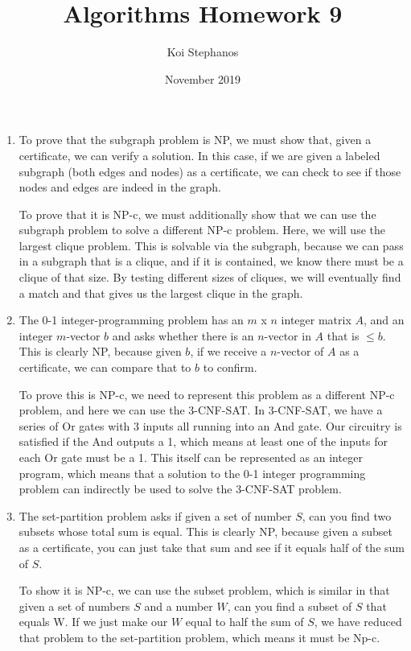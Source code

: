 \documentclass{article}
\title{Algorithms Homework 9}
\author{Koi Stephanos}
\date{November 2019}
\begin{document}
\maketitle

\begin{enumerate}
\item
    To prove that the subgraph problem is NP, we must show that, given a certificate, we can verify a solution. In this case, if we are given a labeled subgraph (both edges and nodes) as a certificate, we can check to see if those nodes and edges are indeed in the graph.
    
    To prove that it is NP-c, we must additionally show that we can use the subgraph problem to solve a different NP-c problem. Here, we will use the largest clique problem. This is solvable via the subgraph, because we can pass in a subgraph that is a clique, and if it is contained, we know there must be a clique of that size. By testing different sizes of cliques, we will eventually find a match and that gives us the largest clique in the graph.

\item
    The 0-1 integer-programming problem has an \(m\) x \(n\) integer matrix \(A\), and an integer \(m\)-vector \(b\) and asks whether there is an \(n\)-vector in \(A\) that is \(\leq b\). This is clearly NP, because given \(b\), if we receive a \(n\)-vector of \(A\) as a certificate, we can compare that to \(b\) to confirm.
    
    To prove this is NP-c, we need to represent this problem as a different NP-c problem, and here we can use the 3-CNF-SAT. In 3-CNF-SAT, we have a series of Or gates with 3 inputs all running into an And gate. Our circuitry is satisfied if the And outputs a 1, which means at least one of the inputs for each Or gate must be a 1. This itself can be represented as an integer program, which means that a solution to the 0-1 integer programming problem can indirectly be used to solve the 3-CNF-SAT problem.
    
\item
    The set-partition problem asks if given a set of number \(S\), can you find two subsets whose total sum is equal. This is clearly NP, because given a subset as a certificate, you can just take that sum and see if it equals half of the sum of \(S\).
    
    To show it is NP-c, we can use the subset problem, which is similar in that given a set of numbers \(S\) and a number \(W\), can you find a subset of \(S\) that equals W. If we just make our \(W\) equal to half the sum of \(S\), we have reduced that problem to the set-partition problem, which means it must be Np-c.
    

\end{enumerate}
\end{document}
